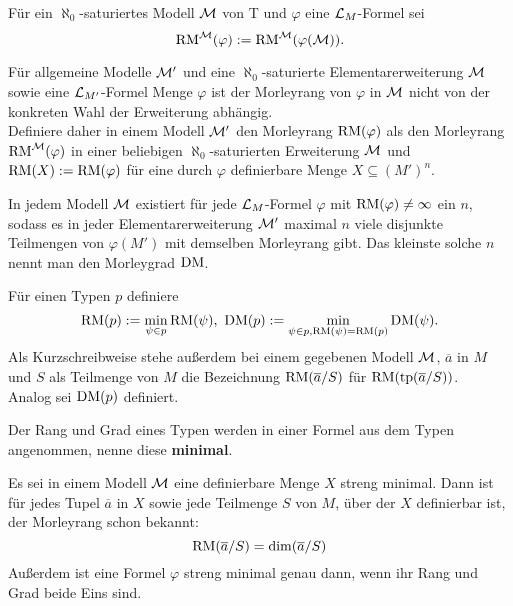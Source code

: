 	\begin{definition}
		Für ein $\aleph_0$-saturiertes Modell $\mathcal{M}$ von T und $\varphi$ eine $\mathcal{L}_M$-Formel sei $$\operatorname{RM}^{\mathcal{M}}(\varphi):=\operatorname{RM}^{\mathcal{M}}(\varphi(\mathcal{M})).$$
	\end{definition}
	\newpage
	\begin{factdef}
		Für allgemeine Modelle $\mathcal{M}'$ und eine $\aleph_0$-saturierte Elementarerweiterung $\mathcal{M}$ sowie eine $\mathcal{L}_{M'}$-Formel Menge $\varphi$ ist der Morleyrang von $\varphi$ in $\mathcal{M}$ nicht von der konkreten Wahl der Erweiterung abhängig.\\
		Definiere daher in einem Modell $\mathcal{M}'$ den Morleyrang $\operatorname{RM}(\varphi)$ als den Morleyrang $\operatorname{RM}^{\mathcal{M}}(\varphi)$ in einer beliebigen $\aleph_0$-saturierten Erweiterung $\mathcal{M}$ und $\operatorname{RM}(X):=\operatorname{RM}(\varphi)$ für eine durch $\varphi$ definierbare Menge $X\subseteq(M')^n$.
	\end{factdef}
	
	\begin{factdef}
		In jedem Modell $\mathcal{M}$ existiert für jede $\mathcal{L}_M$-Formel $\varphi$ mit $\operatorname{RM}(\varphi)\neq\infty$ ein $n$, sodass es in jeder Elementarerweiterung $\mathcal{M}'$ maximal $n$ viele disjunkte Teilmengen von $\varphi(M')$ mit demselben Morleyrang gibt. Das kleinste solche $n$ nennt man den Morleygrad $\operatorname{DM}$.
	\end{factdef}
	
	\begin{definition}
		Für einen Typen $p$ definiere $$\operatorname{RM}(p):=\min\limits_{\psi\in p}\operatorname{RM}(\psi),\ \operatorname{DM}(p):=\min\limits_{\psi\in p,\operatorname{RM}(\psi)=\operatorname{RM}(p)}\operatorname{DM}(\psi).$$
		Als Kurzschreibweise stehe außerdem bei einem gegebenen Modell $\mathcal{M}$, $\overline{a}$ in $M$ und $S$ als Teilmenge von $M$ die Bezeichnung $\operatorname{RM}(\overline{a}/S)$ für $\operatorname{RM}(\operatorname{tp}(\overline{a}/S))$.\\
		Analog sei $\operatorname{DM}(p)$ definiert.
	\end{definition}
	\begin{remark}
		Der Rang und Grad eines Typen werden in einer Formel aus dem Typen angenommen, nenne diese \textbf{minimal}.
	\end{remark}
	
	\begin{fact}
		Es sei in einem Modell $\mathcal{M}$ eine definierbare Menge $X$ streng minimal. Dann ist für jedes Tupel $\overline{a}$ in $X$ sowie jede Teilmenge $S$ von $M$, über der $X$ definierbar ist, der Morleyrang schon bekannt: $$\operatorname{RM}(\overline{a}/S)=\dim(\overline{a}/S)$$
		Außerdem ist eine Formel $\varphi$ streng minimal genau dann, wenn ihr Rang und Grad beide Eins sind.
	\end{fact}
	
